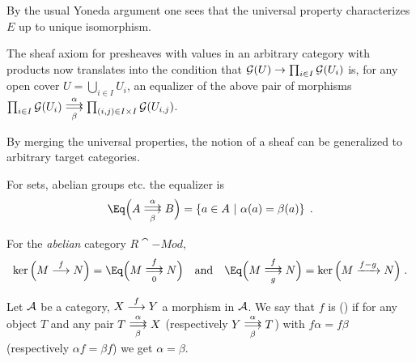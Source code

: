 \documentclass[a4paper,parskip=half,numbers=enddot, DIV=12]{scrreprt}
\begin{document}
	\begin{rem*}
		\begin{alphanumerate}
			\item By the usual Yoneda argument one sees that the universal property characterizes $E$ up to unique isomorphism.
			\item The sheaf axiom for presheaves with values in an arbitrary category with products now translates into the condition that $\mathcal{G}(U)\to\prod_{i\in I}\mathcal{G}(U_i)$ is, for any open cover $U=\bigcup_{i\in I}U_i$, an equalizer of the above pair of morphisms $\prod_{i\in I}\Gg(U_i)\doublemorphism[\alpha][\beta]\prod_{(i,j)\in I\times I}\Gg(U_{i,j})$. 
			
			By merging the universal properties, the notion of a sheaf can be generalized to arbitrary target categories.
			\item For sets, abelian groups etc. the equalizer is 
			\begin{align*}
				\Eq\Big(A\doublemorphism[\alpha][\beta]B\Big)=\left\{a\in A\st \alpha(a)=\beta(a)\right\}\;.
			\end{align*}
			\item For the \emph{abelian} category $R\cat{-Mod}$, 
			\begin{align*}
				\ker\Big(M\morphism[f]N\Big)=\Eq\Big(M\doublemorphism[f][0]N\Big)\quad\text{and}\quad\Eq\Big(M\doublemorphism[f][g]N\Big)=\ker\Big(M\xrightarrow{f-g}N\Big)\;.
			\end{align*}
		\end{alphanumerate}
	\end{rem*}
	\begin{defi}
		Let $\mathcal{A}$ be a category, $X\morphism[f] Y$ a morphism in $\mathcal{A}$. We say that $f$ is  () if for any object $T$ and any pair $T \doublemorphism[\alpha][\smash{\beta}] X$ (respectively $Y\doublemorphism[\smash{\alpha}][\beta] T$) with $f\alpha = f\beta$ (respectively $\alpha f= \beta f$) we get $\alpha =\beta$.
	\end{defi}
\end{document}
